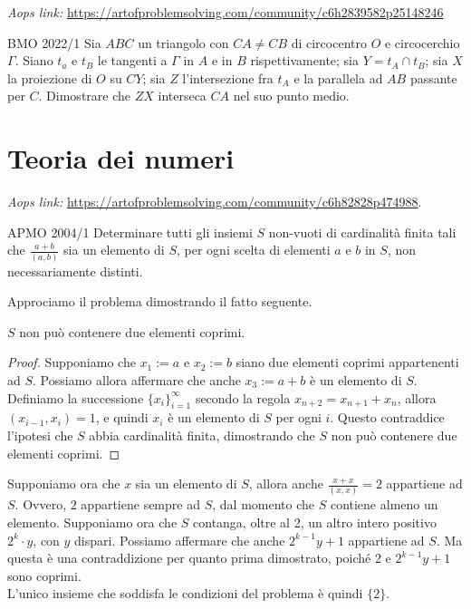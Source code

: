 \documentclass{article}
\begin{document}
\vspace{0.5cm}
\textit{Aops link:}
\href{https://artofproblemsolving.com/community/c6h2839582p25148246}
{https://artofproblemsolving.com/community/c6h2839582p25148246}
\begin{proposition}{BMO 2022/1}{}
	Sia $ABC$ un triangolo con $CA\ne CB$ di circocentro $O$
	e circocerchio $\Gamma$. Siano $t_a$ e $t_B$ le tangenti a $\Gamma$
	in $A$ e in $B$ rispettivamente; sia $Y=t_A\cap t_B$; sia
	$X$ la proiezione di $O$ su $CY$; sia $Z$
	l'intersezione fra $t_A$ e la parallela ad $AB$ passante per $C$.
	Dimostrare che $ZX$ interseca $CA$ nel suo punto medio.
\end{proposition}

\pagebreak
\section{Teoria dei numeri}

\textit{Aops link:}
\href{https://artofproblemsolving.com/community/c6h82828p474988}
{https://artofproblemsolving.com/community/c6h82828p474988}.

\begin{proposition}{APMO 2004/1}{}
	Determinare tutti gli insiemi $S$ non-vuoti di cardinalità finita
	tali che $\frac{a+b}{(a,b)}$ sia un elemento di $S$, per ogni scelta di
	elementi $a$ e $b$ in $S$, non necessariamente distinti.
\end{proposition}

Approciamo il problema dimostrando il fatto seguente.

\begin{claim*}{}{}
	$S$ non può contenere due elementi coprimi.
\end{claim*}
\begin{proof}
	Supponiamo che $x_1:=a$ e $x_2:=b$
	siano due elementi coprimi appartenenti ad $S$.
	Possiamo allora affermare che anche $x_3:=a+b$ è un elemento di $S$.
	Definiamo la successione
	$\{ x_i \}_{i=1}^{\infty}$ secondo la regola $x_{n+2}=x_{n+1}+x_n$,
	allora $(x_{i-1},x_{i})=1$, e quindi $x_i$ è un elemento di $S$
	per ogni $i$. Questo contraddice l'ipotesi che $S$ abbia cardinalità
	finita, dimostrando che $S$ non può contenere due elementi coprimi.
\end{proof}

Supponiamo ora che $x$ sia un elemento di $S$, allora anche
$\frac{x+x}{(x,x)}=2$ appartiene ad $S$. Ovvero, $2$ appartiene
sempre ad $S$, dal momento che $S$ contiene almeno un elemento.
Supponiamo ora che $S$ contanga, oltre al 2, un altro intero positivo
$2^k\cdot y$, con $y$ dispari. Possiamo affermare che anche
$2^{k-1}y+1$ appartiene ad $S$. Ma questa è una contraddizione
per quanto prima dimostrato,
poiché $2$ e $2^{k-1}y+1$ sono coprimi.\\
L'unico insieme che soddisfa le condizioni del problema
è quindi $\{ 2\}$.
\end{document}

